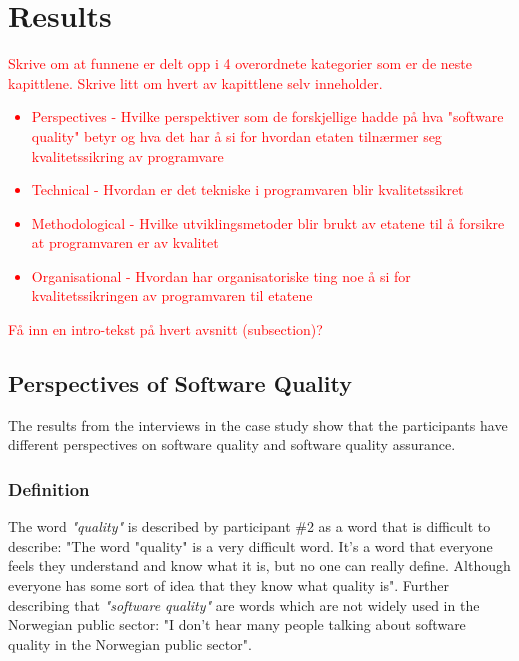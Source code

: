 \chapter{Results}

\textcolor{red}{Skrive om at funnene er delt opp i 4 overordnete kategorier som er de neste kapittlene. Skrive litt om hvert av kapittlene selv inneholder.
\begin{itemize}
    \item Perspectives - Hvilke perspektiver som de forskjellige hadde på hva "software quality" betyr og hva det har å si for hvordan etaten tilnærmer seg kvalitetssikring av programvare
    \item Technical - Hvordan er det tekniske i programvaren blir kvalitetssikret
    \item Methodological - Hvilke utviklingsmetoder blir brukt av etatene til å forsikre at programvaren er av kvalitet
    \item Organisational - Hvordan har organisatoriske ting noe å si for kvalitetssikringen av programvaren til etatene
\end{itemize}
}

\textcolor{red}{Få inn en intro-tekst på hvert avsnitt (subsection)?}

\section{Perspectives of Software Quality}
The results from the interviews in the case study show that the participants have different perspectives on software quality and software quality assurance.

\subsection{Definition}
The word \textit{"quality"} is described by participant \#2 as a word that is difficult to describe: "The word "quality" is a very difficult word. It's a word that everyone feels they understand and know what it is, but no one can really define. Although everyone has some sort of idea that they know what quality is". Further describing that \textit{"software quality"} are words which are not widely used in the Norwegian public sector: "I don't hear many people talking about software quality in the Norwegian public sector".


